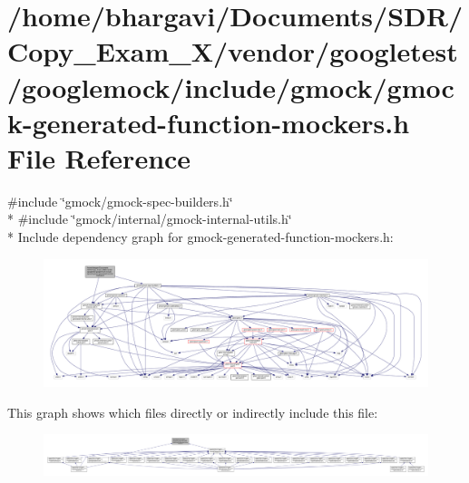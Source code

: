 \hypertarget{gmock-generated-function-mockers_8h}{}\section{/home/bhargavi/\+Documents/\+S\+D\+R/\+Copy\+\_\+\+Exam\+\_\+X/vendor/googletest/googlemock/include/gmock/gmock-\/generated-\/function-\/mockers.h File Reference}
\label{gmock-generated-function-mockers_8h}
{\ttfamily \#include \char`\"{}gmock/gmock-\/spec-\/builders.\+h\char`\"{}}\\*
{\ttfamily \#include \char`\"{}gmock/internal/gmock-\/internal-\/utils.\+h\char`\"{}}\\*
Include dependency graph for gmock-\/generated-\/function-\/mockers.h\+:
\nopagebreak
\begin{figure}[H]
\begin{center}
\leavevmode
\includegraphics[width=350pt]{gmock-generated-function-mockers_8h__incl}
\end{center}
\end{figure}
This graph shows which files directly or indirectly include this file\+:
\nopagebreak
\begin{figure}[H]
\begin{center}
\leavevmode
\includegraphics[width=350pt]{gmock-generated-function-mockers_8h__dep__incl}
\end{center}
\end{figure}
